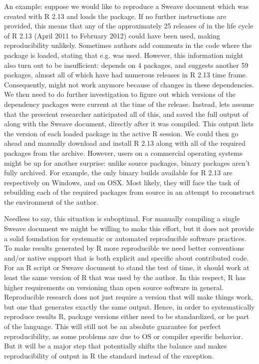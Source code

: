 An example: suppose we would like to reproduce a Sweave document which was
created with R 2.13 and loads the  package. If no further
instructions are provided, this means that any of the approximately 25 releases
of  in the life cycle of R 2.13 (April 2011 to February 2012) could
have been used, making reproducibility unlikely. Sometimes authors add comments
in the code where the package is loaded, stating that e.g.  was
used. However, this information might also turn out to be insufficient:
 depends on 4 packages, and suggests another 59 packages, almost all of which
have had numerous releases in R 2.13 time frame.
Consequently,  might not work anymore because of changes in
these dependencies. We then need to do further investigation to figure out
which versions of the dependency packages were current at the time of the
 release. Instead, lets assume that the prescient researcher
anticipated all of this, and saved the full output of 
along with the Sweave document, directly after it was compiled. This output
lists the version of each loaded package in the active R session.
We could then go ahead and manually download and install R 2.13 along with all
of the required packages from the archive. However, users on a commercial
operating systems might be up for another surprise: unlike source packages,
binary packages aren't fully archived. For example, the only binary builds
available for R 2.13 are respectively  on Windows, and
 on OSX. Most likely, they will face the task of rebuilding
each of the required packages from source in an attempt to reconstruct the
environment of the author.

Needless to say, this situation is suboptimal. For manually compiling a single
Sweave document we might be willing to make this effort, but it does not
provide a solid foundation for systematic or automated reproducible software
practices. To make results generated by R more reproducible we need better
conventions and/or native support that is both explicit and specific about
contributed code. For an R script or Sweave document to stand the test of time,
it should work at least the same version of R that was used by the author. In
this respect, R has higher requirements on versioning than open source software
in general. Reproducible research does not just require a version that will
make things work, but one that generates exactly the same output. Hence, in
order to systematically reproduce results R, package versions either need to be
standardized, or be part of the language. This will still not be an absolute
guarantee for perfect reproducibility, as some problems are due to OS or
compiler specific behavior. But it will be a major step that potentially shifts
the balance and makes reproducibility of output in R the standard instead of
the exception.
 
